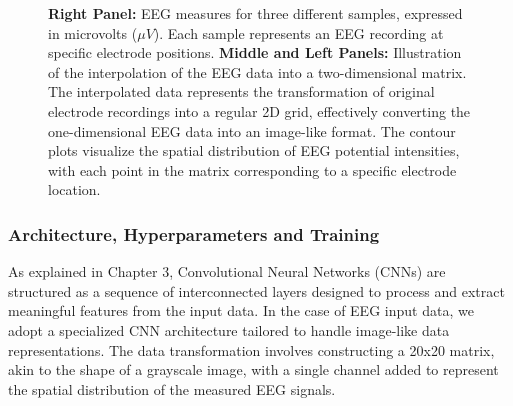 \documentclass[a4paper, UKenglish, 11pt]{uiomaster}
\begin{document}
\begin{figure}[!htb]
\caption{\newline
\textbf{Right Panel:} EEG measures for three different samples, expressed in microvolts ($\mu V$). Each sample represents an EEG recording at specific electrode positions. \newline
\textbf{Middle and Left Panels:} Illustration of the interpolation of the EEG data into a two-dimensional matrix. The interpolated data represents the transformation of original electrode recordings into a regular 2D grid, effectively converting the one-dimensional EEG data into an image-like format. The contour plots visualize the spatial distribution of EEG potential intensities, with each point in the matrix corresponding to a specific electrode location.}
\label{fig:eeg_dipole_pos_0}

\end{figure}

\subsubsection{Architecture, Hyperparameters and Training}

As explained in Chapter 3, Convolutional Neural Networks (CNNs) are structured as a sequence of interconnected layers designed to process and extract meaningful features from the input data. In the case of EEG input data, we adopt a specialized CNN architecture tailored to handle image-like data representations. The data transformation involves constructing a 20x20 matrix, akin to the shape of a grayscale image, with a single channel added to represent the spatial distribution of the measured EEG signals.
\end{document}
